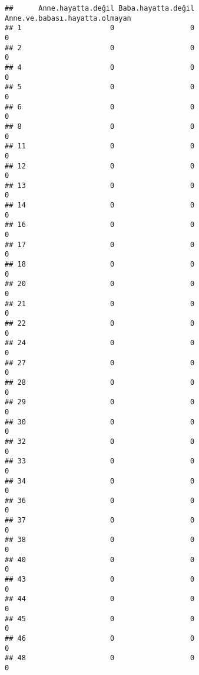 \documentclass[
]{article}
\begin{document}
\begin{verbatim}
##      Anne.hayatta.değil Baba.hayatta.değil Anne.ve.babası.hayatta.olmayan
## 1                     0                  0                              0
## 2                     0                  0                              0
## 4                     0                  0                              0
## 5                     0                  0                              0
## 6                     0                  0                              0
## 8                     0                  0                              0
## 11                    0                  0                              0
## 12                    0                  0                              0
## 13                    0                  0                              0
## 14                    0                  0                              0
## 16                    0                  0                              0
## 17                    0                  0                              0
## 18                    0                  0                              0
## 20                    0                  0                              0
## 21                    0                  0                              0
## 22                    0                  0                              0
## 24                    0                  0                              0
## 27                    0                  0                              0
## 28                    0                  0                              0
## 29                    0                  0                              0
## 30                    0                  0                              0
## 32                    0                  0                              0
## 33                    0                  0                              0
## 34                    0                  0                              0
## 36                    0                  0                              0
## 37                    0                  0                              0
## 38                    0                  0                              0
## 40                    0                  0                              0
## 43                    0                  0                              0
## 44                    0                  0                              0
## 45                    0                  0                              0
## 46                    0                  0                              0
## 48                    0                  0                              0

\end{verbatim}
\end{document}
